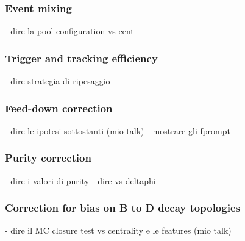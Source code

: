 \subsubsection{Event mixing}
- dire la pool configuration vs cent

\subsubsection{Trigger and tracking efficiency}
- dire strategia di ripesaggio

\subsubsection{Feed-down correction}
- dire le ipotesi sottostanti (mio talk)
- mostrare gli fprompt

\subsubsection{Purity correction}
- dire i valori di purity
- dire vs deltaphi

\subsubsection{Correction for bias on B to D decay topologies}
- dire il MC closure test vs centrality e le features (mio talk)
